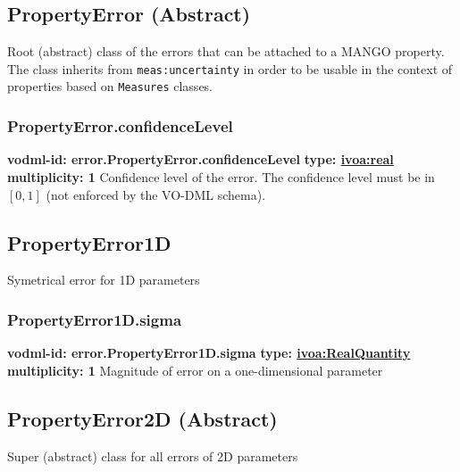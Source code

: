   \subsection{PropertyError (Abstract)}
  \label{sect:error.PropertyError}
    Root (abstract) class of the errors that can be attached to a MANGO property. The class inherits from \texttt{meas:uncertainty} in order to be usable in the context of properties based on \texttt{Measures} classes.

    \subsubsection{PropertyError.confidenceLevel}
      \textbf{vodml-id: error.PropertyError.confidenceLevel} \newline
      \textbf{type: \hyperref[sect:ivoa]{ivoa:real}} \newline
      \textbf{multiplicity: 1} \newline 
      Confidence level of the error. The confidence level must be in $[0, 1]$ (not enforced by the VO-DML schema).

  \subsection{PropertyError1D}
  \label{sect:error.PropertyError1D}
    Symetrical error for 1D parameters

    \subsubsection{PropertyError1D.sigma}
      \textbf{vodml-id: error.PropertyError1D.sigma} \newline
      \textbf{type: \hyperref[sect:ivoa]{ivoa:RealQuantity}} \newline
      \textbf{multiplicity: 1} \newline 
      Magnitude of error on a one-dimensional parameter

  \subsection{PropertyError2D (Abstract)}
  \label{sect:error.PropertyError2D}
    Super (abstract) class for all errors of 2D parameters

\pagebreak
